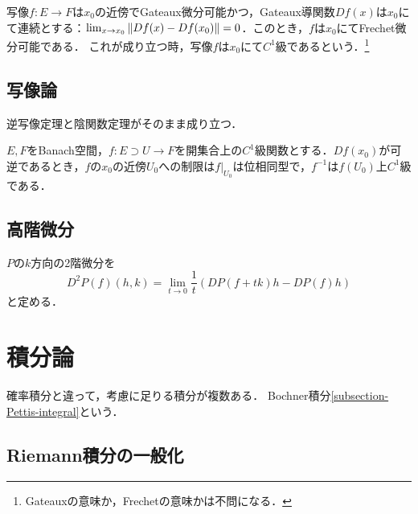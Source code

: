 \documentclass[uplatex,dvipdfmx]{jsreport}
\begin{document}
\begin{theorem}[$C^1$級]
    写像$f:E\to F$は$x_0$の近傍でGateaux微分可能かつ，Gateaux導関数$Df(x)$は$x_0$にて連続とする：$\lim_{x\to x_0}\|Df(x)-Df(x_0)\|=0$．このとき，$f$は$x_0$にてFrechet微分可能である．
    これが成り立つ時，写像$f$は$x_0$にて$C^1$級であるという．\footnote{Gateauxの意味か，Frechetの意味かは不問になる．}
\end{theorem}

\subsection{写像論}

\begin{tcolorbox}[colframe=ForestGreen, colback=ForestGreen!10!white,breakable,colbacktitle=ForestGreen!40!white,coltitle=black,fonttitle=\bfseries\sffamily,
title=]
    逆写像定理と陰関数定理がそのまま成り立つ．
\end{tcolorbox}

\begin{theorem}
    $E,F$をBanach空間，$f:E\supset U\to F$を開集合上の$C^1$級関数とする．$Df(x_0)$が可逆であるとき，$f$の$x_0$の近傍$U_0$への制限は$f|_{U_0}$は位相同型で，$f^{-1}$は$f(U_0)$上$C^1$級である．
\end{theorem}

\subsection{高階微分}

\begin{definition}
    $P$の$k$方向の2階微分を
    \[D^2P(f)(h,k)=\lim_{t\to0}\frac{1}{t}(DP(f+tk)h-DP(f)h)\]
    と定める．
\end{definition}

\section{積分論}

\begin{tcolorbox}[colframe=ForestGreen, colback=ForestGreen!10!white,breakable,colbacktitle=ForestGreen!40!white,coltitle=black,fonttitle=\bfseries\sffamily,
title=]
    確率積分と違って，考慮に足りる積分が複数ある．
    Bochner積分\ref{subsection-Pettis-integral}という．
\end{tcolorbox}

\subsection{Riemann積分の一般化}
\end{document}
